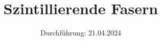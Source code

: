 

\title{Szintillierende Fasern}
\date{%
  Durchführung: 21.04.2024
}



\maketitle
\thispagestyle{empty}
\tableofcontents
\newpage






\printbibliography{}

\appendix
\newpage
%


